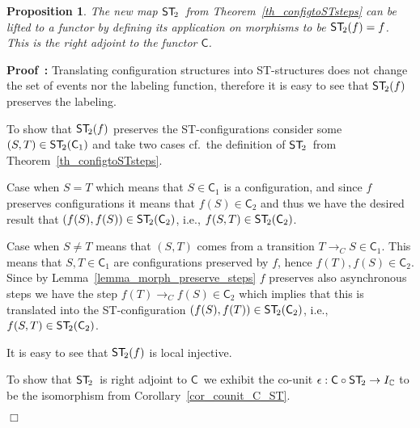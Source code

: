 \documentclass[submission,copyright,creativecommons]{eptcs}
\newtheorem{proposition}[theorem]{Proposition}
\newenvironment{proof}[1][\!\!\,]{\vspace{1ex}\noindent\textbf{Proof #1: }}{\hfill$\Box$\vspace{2ex}}
\newcounter{case}
\newcommand\C{\ensuremath{\mathsf{C}}}
\newcommand\allC{\ensuremath{\mathbb{C}}}
\newcommand\stepTransConfGlabbeek{\ensuremath{\rightarrow_{C}}}
\newcommand\cintostSecond{\ensuremath{\mathsf{ST}_{\hspace{-0.4ex}2}}}
\newcommand\stintoc{\ensuremath{\mathsf{C}}}
\newcommand\counit{\ensuremath{\epsilon}}
\begin{document}
\begin{proposition}
The new map \cintostSecond\ from Theorem~\ref{th_configtoSTsteps} can be lifted to a functor by defining its application on morphisms to be $\cintostSecond(f)=f$. This is the right adjoint to the functor \stintoc.
\end{proposition}

\begin{proof}
Translating configuration structures into ST-structures does not change the set of events nor the labeling function, therefore it is easy to see that $\cintostSecond(f)$ preserves the labeling.

To show that $\cintostSecond(f)$ preserves the ST-configurations consider some $(S,T)\in\cintostSecond(\C_{1})$ and take two cases cf.\ the definition of \cintostSecond\ from Theorem~\ref{th_configtoSTsteps}.

Case when $S=T$ which means that $S\in\C_{1}$ is a configuration, and since $f$ preserves configurations it means that $f(S)\in\C_{2}$ and thus we have the desired result that $(f(S),f(S))\in\cintostSecond(\C_{2})$, i.e., $f(S,T)\in\cintostSecond(\C_{2})$.

Case when $S\neq T$ means that $(S,T)$ comes from a transition $T\stepTransConfGlabbeek S\in\C_{1}$. This means that $S,T\in\C_{1}$ are configurations preserved by $f$, hence $f(T),f(S)\in\C_{2}$. Since by Lemma~\ref{lemma_morph_preserve_steps} $f$ preserves also asynchronous steps we have the step $f(T)\stepTransConfGlabbeek f(S)\in\C_{2}$ which implies that this is translated into the ST-configuration $(f(S),f(T))\in\cintostSecond(\C_{2})$, i.e., $f(S,T)\in\cintostSecond(\C_{2})$.

It is easy to see that $\cintostSecond(f)$ is local injective.

To show that \cintostSecond\ is right adjoint to \stintoc\ we exhibit the co-unit $\counit:\stintoc\circ\cintostSecond\rightarrow I_{\allC}$ to be the isomorphism from Corollary~\ref{cor_counit_C_ST}.


\end{proof}
\end{document}
